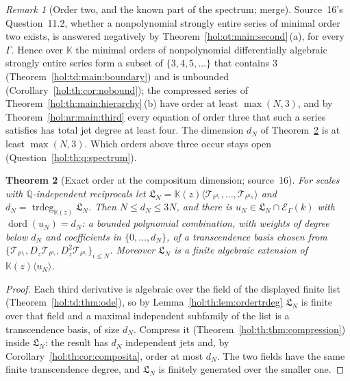 \documentclass[11pt]{article}
\numberwithin{equation}{section}
\newtheorem{theorem}{Theorem}[section]
\theoremstyle{definition}
\theoremstyle{remark}
\newtheorem{remark}[theorem]{Remark}
\newcommand{\Q}{\mathbb Q}
\newcommand{\KK}{\mathbb K}
\newcommand{\EK}{\mathcal E_\Gamma(k)}
\newcommand{\trdeg}{\operatorname{trdeg}}
\begin{document}
\begin{remark}[Order two, and the known part of the spectrum; merge]
\label{hol:th:rem:ordertwo}
Source~16's Question~11.2, whether a nonpolynomial strongly entire series of
minimal order two exists, is answered negatively by
Theorem~\ref{hol:ot:main:second}\,(a), for every $\Gamma$. Hence over $\KK$
the minimal orders of nonpolynomial differentially algebraic strongly entire
series form a subset of $\{3,4,5,\ldots\}$ that contains $3$
(Theorem~\ref{hol:td:main:boundary}) and is unbounded
(Corollary~\ref{hol:th:cor:nobound}); the compressed series of
Theorem~\ref{hol:th:main:hierarchy}\,(b) have order at least $\max(N,3)$, and
by Theorem~\ref{hol:nr:main:third} every equation of order three that such a
series satisfies has total jet degree at least four. The dimension $d_N$ of
Theorem~\ref{hol:th:thm:exactdimension} is at least $\max(N,3)$. Which orders
above three occur stays open (Question~\ref{hol:th:q:spectrum}).
\end{remark}

\begin{theorem}[Exact order at the compositum dimension; source~16]
\label{hol:th:thm:exactdimension}
For scales with $\Q$-independent reciprocals let
$\mathfrak L_N=\KK(z)\langle\mathcal T_{t^{\mu_1}},\ldots,
\mathcal T_{t^{\mu_N}}\rangle$ and $d_N=\trdeg_{\KK(z)}\mathfrak L_N$. Then
$N\le d_N\le3N$, and there is $u_N\in\mathfrak L_N\cap\EK$ with
$\operatorname{dord}(u_N)=d_N$: a bounded polynomial combination, with weights
of degree below $d_N$ and coefficients in $\{0,\ldots,d_N\}$, of a
transcendence basis chosen from $\{\mathcal T_{t^{\mu_i}},D_z\mathcal
T_{t^{\mu_i}},D_z^2\mathcal T_{t^{\mu_i}}\}_{i\le N}$. Moreover $\mathfrak L_N$ is
a finite algebraic extension of $\KK(z)\langle u_N\rangle$.
\end{theorem}

\begin{proof}
Each third derivative is algebraic over the field of the displayed finite list
(Theorem~\ref{hol:td:thm:ode}), so by Lemma~\ref{hol:th:lem:ordertrdeg}
$\mathfrak L_N$ is finite over that field and a maximal independent subfamily
of the list is a transcendence basis, of size $d_N$. Compress it
(Theorem~\ref{hol:th:thm:compression}) inside $\mathfrak L_N$: the result has
$d_N$ independent jets and, by Corollary~\ref{hol:th:cor:composita}, order at
most $d_N$. The two fields have the same finite transcendence degree, and
$\mathfrak L_N$ is finitely generated over the smaller one.
\end{proof}
\end{document}
